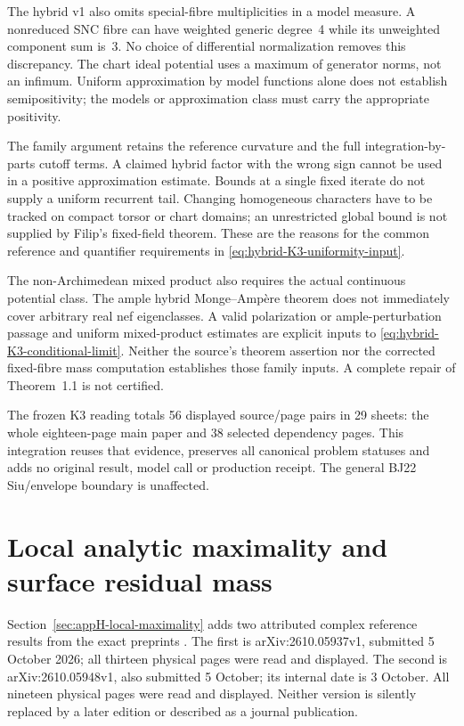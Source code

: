 The hybrid v1 also omits special-fibre multiplicities in a model
measure. A nonreduced SNC fibre can have weighted generic degree~4
while its unweighted component sum is~3. No choice of differential
normalization removes this discrepancy. The chart ideal potential
uses a maximum of generator norms, not an infimum. Uniform approximation
by model functions alone does not establish semipositivity; the
models or approximation class must carry the appropriate positivity.

The family argument retains the reference curvature and the full
integration-by-parts cutoff terms. A claimed hybrid factor with
the wrong sign cannot be used in a positive approximation estimate.
Bounds at a single fixed iterate do not supply a uniform recurrent
tail. Changing homogeneous characters have to be tracked on compact
torsor or chart domains; an unrestricted global bound is not supplied
by Filip's fixed-field theorem. These are the reasons for the common
reference and quantifier requirements in
\eqref{eq:hybrid-K3-uniformity-input}.

The non-Archimedean mixed product also requires the actual continuous
potential class. The ample hybrid Monge--Amp\`ere theorem does not
immediately cover arbitrary real nef eigenclasses. A valid
polarization or ample-perturbation passage and uniform mixed-product
estimates are explicit inputs to
\eqref{eq:hybrid-K3-conditional-limit}. Neither the source's theorem
assertion nor the corrected fixed-fibre mass computation establishes
those family inputs. A complete repair of Theorem~1.1 is not certified.

The frozen K3 reading totals 56 displayed source/page pairs in
29 sheets: the whole eighteen-page main paper and 38 selected
dependency pages. This integration reuses that evidence, preserves
all canonical problem statuses and adds no original result, model
call or production receipt. The general BJ22 Siu/envelope boundary
is unaffected.

\section{Local analytic maximality and surface residual mass}
\label{sec:provenance-Do-Hiep-local-maximality}

Section~\ref{sec:appH-local-maximality} adds two attributed complex
reference results from the exact preprints
\cite{DoHiep26MaximalityV1,DoHiep26LocalComparisonV1}.
The first is arXiv:\allowbreak 2610.05937v1, submitted
5 October 2026; all thirteen physical pages were read and displayed.
The second is arXiv:\allowbreak 2610.05948v1, also submitted
5 October; its internal date is 3 October. All nineteen physical
pages were read and displayed. Neither version is silently replaced
by a later edition or described as a journal publication.

